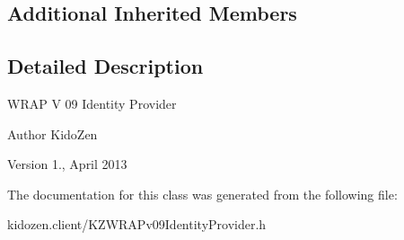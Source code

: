 \subsection*{Additional Inherited Members}


\subsection{Detailed Description}
W\-R\-A\-P V 09 Identity Provider

\begin{DoxyAuthor}{Author}
Kido\-Zen 
\end{DoxyAuthor}
\begin{DoxyVersion}{Version}
1., April 2013 
\end{DoxyVersion}


The documentation for this class was generated from the following file\-:\begin{DoxyCompactItemize}
\item 
kidozen.\-client/K\-Z\-W\-R\-A\-Pv09\-Identity\-Provider.\-h\end{DoxyCompactItemize}
